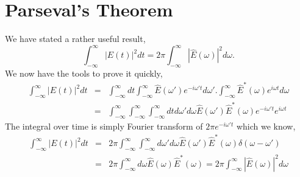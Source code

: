\section{Parseval's Theorem}
\label{sec:an-math-asid}

We have stated a rather useful result,
\begin{equation}
\int_{-\infty}^{\infty} |E(t)|^2 dt = 2\pi \int_{-\infty}^{\infty} 
|{\hat E}(\omega)|^2 d \omega.
\label{eq:159}
\end{equation}
We now have the tools to prove it quickly,
\begin{eqnarray}
\int_{-\infty}^{\infty} |E(t)|^2 dt &=& \int_{-\infty}^{\infty} d t
  \int_{-\infty}^{\infty} {\hat E}(\omega')
e^{-i\omega' t} d \omega'.
  \int_{-\infty}^{\infty} {\hat E}^*(\omega)
e^{i\omega t} d \omega \\
&=& \int_{-\infty}^{\infty}  \int_{-\infty}^{\infty}
  \int_{-\infty}^{\infty} d t d\omega' d \omega
 {\hat E}(\omega') {\hat E}^*(\omega)
e^{-i\omega' t} e^{i\omega t} 
\label{eq:160}
\end{eqnarray}
The integral over time is simply Fourier transform of $2\pi
e^{-i\omega' t}$ which we know,
\begin{eqnarray}
\int_{-\infty}^{\infty} |E(t)|^2 dt &=& 2\pi 
\int_{-\infty}^{\infty}
  \int_{-\infty}^{\infty} d\omega' d \omega
 {\hat E}(\omega') {\hat E}^*(\omega) \delta (\omega -\omega') \\
 &=& 2 \pi \int_{-\infty}^{\infty} d \omega
 {\hat E}(\omega) {\hat E}^*(\omega) =2 \pi \int_{-\infty}^{\infty}
 |{\hat E}(\omega)|^2  d \omega
\label{eq:161}
\end{eqnarray}


